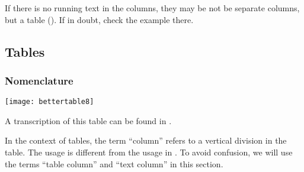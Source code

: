 \begin{note}
If there is no running text in the columns, they may be not be separate columns, but a table (). If in doubt, check the example there.
\end{note}


\tocspace
\subsection{Tables}
\label{section tables}

\subsubsection{Nomenclature}
\label{section tables overview}

\texttt{[image: bettertable8]}

\begin{typeLatin}
\end{typeLatin}


\vspace{-10mm}
\begin{crossref}
A transcription of this table can be found in .
\end{crossref}

\vspace{3mm}
\begin{note}
In the context of tables, the term “column” refers to a vertical division in the table. The usage is different from the usage in . To avoid confusion, we will use the terms “table column” and “text column” in this section.
\end{note}

